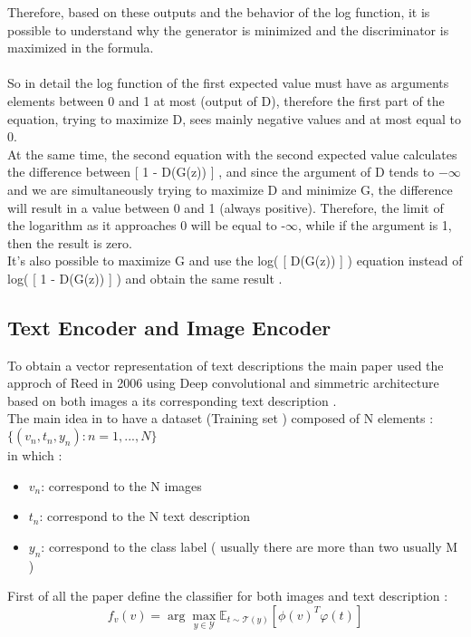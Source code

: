 Therefore, based on these outputs and the behavior of the log function, it is possible to understand why 
the generator is minimized and the discriminator is maximized in the formula.
\\\\
So in detail the log function of the first expected value must have as arguments elements between 0 and 1 at most 
(output of D), therefore the first part of the equation, trying to maximize D, sees mainly negative values and at 
most equal to 0. \\
At the same time, the second equation with the second expected value calculates the difference between [ 1 - D(G(z)) ] 
, and since the argument of D tends to $-\infty$ and we are simultaneously trying to maximize D and minimize G,   %
the difference will result in a value between 0 and 1 (always positive).
Therefore, the limit of the logarithm as it approaches 0 will be equal to -$\infty$, 
while if the argument is 1, then the result is zero. \\
It's also possible to maximize G and use the log( [ D(G(z)) ] ) equation instead of log( [ 1 - D(G(z)) ] ) and 
obtain the same result . 


\subsection*{Text Encoder and Image Encoder}
To obtain a vector representation of text descriptions the main paper used the approch 
of Reed in 2006 using Deep convolutional and simmetric architecture based on both 
images a its corresponding text description . \\
The main idea in to have a dataset (Training set ) composed of N elements : 
\\
$ \{(v_n, t_n, y_n) : n = 1, ..., N\} $
\\
in which :
\begin{itemize}
    \item $ v_n $: correspond to the N images
    \item $ t_n $: correspond to the N text description
    \item $ y_n $: correspond to the class label ( usually there are more than two usually M )
\end{itemize}

First of all the paper define the classifier for both images and text description :
\begin{equation}
    f_v(v) = \arg \max_{y \in \mathcal{Y}} \mathbb{E}_{t \sim \mathcal{T}(y)} [\phi(v)^T \varphi(t)]
\end{equation}
    
